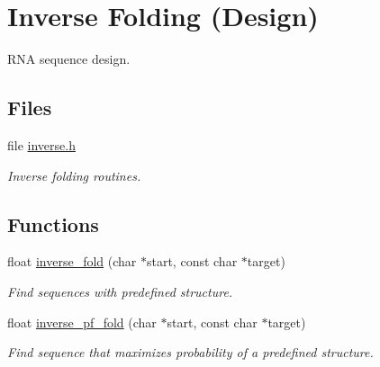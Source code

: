\hypertarget{group__inverse__fold}{}\section{Inverse Folding (Design)}
\label{group__inverse__fold}


R\+NA sequence design.  


\subsection*{Files}
\begin{DoxyCompactItemize}
\item 
file \hyperlink{inverse_8h}{inverse.\+h}
\begin{DoxyCompactList}\small\item\em Inverse folding routines. \end{DoxyCompactList}\end{DoxyCompactItemize}
\subsection*{Functions}
\begin{DoxyCompactItemize}
\item 
float \hyperlink{group__inverse__fold_ga7af026de55d4babad879f2c92559cbbc}{inverse\+\_\+fold} (char $\ast$start, const char $\ast$target)
\begin{DoxyCompactList}\small\item\em Find sequences with predefined structure. \end{DoxyCompactList}\item 
float \hyperlink{group__inverse__fold_gaeef52ecbf2a2450ad585a344f9826806}{inverse\+\_\+pf\+\_\+fold} (char $\ast$start, const char $\ast$target)
\begin{DoxyCompactList}\small\item\em Find sequence that maximizes probability of a predefined structure. \end{DoxyCompactList}\end{DoxyCompactItemize}
